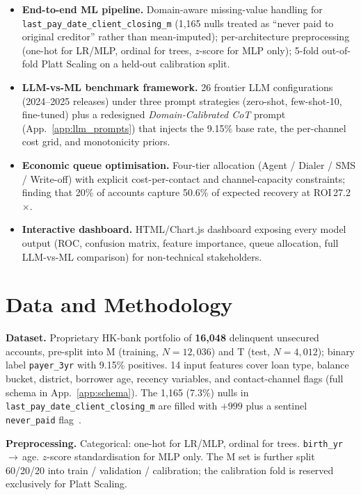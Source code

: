 \documentclass[11pt, a4paper]{article}
\begin{document}
\begin{itemize}
\item \textbf{End-to-end ML pipeline.} Domain-aware missing-value handling for \texttt{last\_pay\_date\_client\_closing\_m} (1{,}165 nulls treated as ``never paid to original creditor'' rather than mean-imputed); per-architecture preprocessing (one-hot for LR/MLP, ordinal for trees, $z$-score for MLP only); 5-fold out-of-fold Platt Scaling on a held-out calibration split.
\item \textbf{LLM-vs-ML benchmark framework.} 26 frontier LLM configurations (2024--2025 releases) under three prompt strategies (zero-shot, few-shot-10, fine-tuned) plus a redesigned \emph{Domain-Calibrated CoT} prompt (App.~\ref{app:llm_prompts}) that injects the 9.15\% base rate, the per-channel cost grid, and monotonicity priors.
\item \textbf{Economic queue optimisation.} Four-tier allocation (Agent / Dialer / SMS / Write-off) with explicit cost-per-contact and channel-capacity constraints; finding that 20\% of accounts capture 50.6\% of expected recovery at ROI\,27.2$\times$.
\item \textbf{Interactive dashboard.} HTML/Chart.js dashboard exposing every model output (ROC, confusion matrix, feature importance, queue allocation, full LLM-vs-ML comparison) for non-technical stakeholders.
\end{itemize}

\section{Data and Methodology}\label{sec:methodology}

\textbf{Dataset.} Proprietary HK-bank portfolio of \textbf{16{,}048} delinquent unsecured accounts, pre-split into M (training, $N=12{,}036$) and T (test, $N=4{,}012$); binary label \texttt{payer\_3yr} with 9.15\% positives. 14 input features cover loan type, balance bucket, district, borrower age, recency variables, and contact-channel flags (full schema in App.~\ref{app:schema}). The 1{,}165 (7.3\%) nulls in \texttt{last\_pay\_date\_client\_closing\_m} are filled with $+999$ plus a sentinel \texttt{never\_paid} flag~\cite{little2002}.

\textbf{Preprocessing.} Categorical: one-hot for LR/MLP, ordinal for trees. \texttt{birth\_yr}\,$\to$\,age. $z$-score standardisation for MLP only. The M set is further split 60/20/20 into train / validation / calibration; the calibration fold is reserved exclusively for Platt Scaling.
\end{document}
